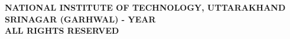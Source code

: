 \vspace*{\fill}
\begin{center}
	\textbf{\textcopyright NATIONAL INSTITUTE OF TECHNOLOGY, UTTARAKHAND \\
		SRINAGAR (GARHWAL) - YEAR \\
		ALL RIGHTS RESERVED } 
\end{center}
\vspace*{\fill}